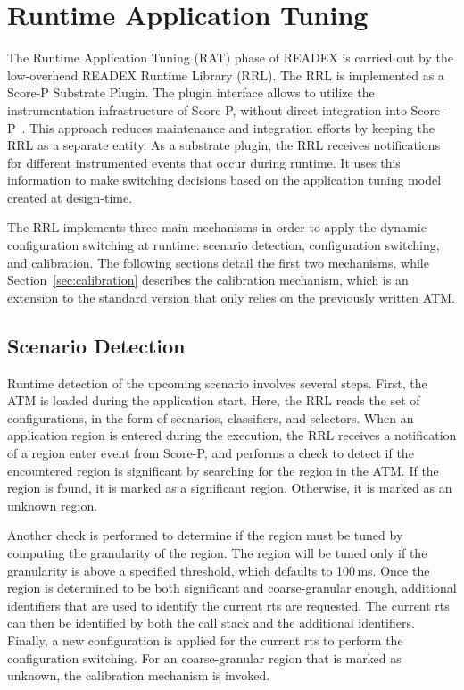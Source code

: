 \section{Runtime Application Tuning} \label{rat}

The Runtime Application Tuning (RAT) phase of READEX is carried out by the low-overhead READEX Runtime Library (RRL). The RRL is implemented as a Score-P Substrate Plugin. The plugin interface allows to utilize the instrumentation infrastructure of Score-P, without direct integration into Score-P~\cite{Schoene2017}. This approach reduces maintenance and integration efforts by keeping the RRL as a separate entity. As a substrate plugin, the RRL receives notifications for different instrumented events that occur during runtime. It uses this information to make switching decisions based on the application tuning model created at design-time.

The RRL implements three main mechanisms in order to apply the dynamic configuration switching at runtime: scenario detection, configuration switching, and calibration. The following sections detail the first two mechanisms, while Section~\ref{sec:calibration} describes the calibration mechanism, which is an extension to the standard version that only relies on the previously written ATM.


\subsection{Scenario Detection}\label{scenario-detection}
Runtime detection of the upcoming scenario involves several steps. First, the ATM is loaded during the application start. Here, the RRL reads the set of configurations, in the form of scenarios, classifiers, and selectors. When an application region is entered during the execution, the RRL receives a notification of a region enter event from Score-P, and performs a check to detect if the encountered region is significant by searching for the region in the ATM. If the region is found, it is marked as a significant region. Otherwise, it is marked as an unknown region. 

Another check is performed to determine if the region must be tuned by computing the granularity of the region. The region will be tuned only if the granularity is above a specified threshold, which defaults to 100\,ms. Once the region is determined to be both significant and coarse-granular enough, additional identifiers that are used to identify the current rts are requested. The current rts can then be identified by both the call stack and the additional identifiers. Finally, a new configuration is applied for the current rts to perform the configuration switching.
For an coarse-granular region that is marked as unknown, the calibration mechanism is invoked.


